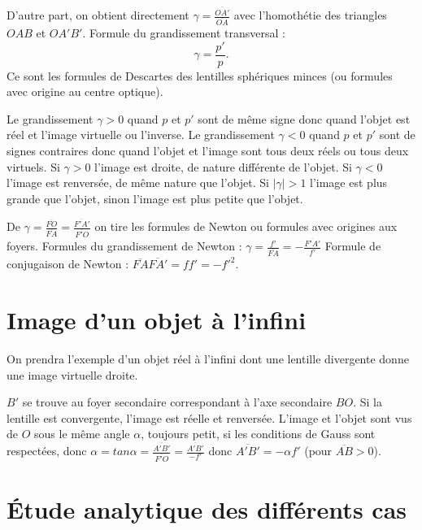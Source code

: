 D'autre	 part, on obtient directement \(\gamma = 
\frac{\overline{OA'}}{\overline{OA}}\) avec l'homothétie des triangles \(OAB\) 
et \(OA'B'\).
Formule du grandissement transversal :
\begin{equation}%
  \gamma = \frac{p'}{p}.
\end{equation}%
Ce sont les formules de Descartes des lentilles sphériques minces (ou formules 
avec origine au centre optique).

Le grandissement \(\gamma > 0\) quand \(p\) et \(p'\) sont de même signe donc 
quand l'objet est réel et l'image virtuelle ou l'inverse. Le grandissement 
\(\gamma < 0\) quand \(p\) et \(p'\) sont de signes contraires donc quand 
l'objet et l'image sont tous deux réels ou tous deux virtuels. Si \(\gamma > 
0\) l'image est droite, de nature différente de l'objet. Si \(\gamma < 0\) 
l'image est renversée, de même nature que l'objet. Si \(|\gamma| > 1\)  l'image 
est plus grande que l'objet, sinon l'image est plus petite que l'objet.

De \(\gamma = \frac{\overline{FO}}{\overline{FA}} = 
\frac{\overline{F'A'}}{\overline{F'O}}\) on tire les formules de Newton ou 
formules avec origines aux foyers.
Formules du grandissement de Newton : \(\gamma = 
\frac{f'}{\overline{FA}}=-\frac{\overline{F'A'}}{f'}\)
Formule de conjugaison de Newton : \(\overline{FA}\overline{FA'} = ff' = 
-f'^2\).

\section{Image d'un objet à l'infini}%
\label{chap8-sec:imagealinfini}%

On prendra l'exemple d'un objet réel à l'infini dont une lentille divergente 
donne une image virtuelle droite.
%

\(B'\) se trouve au foyer secondaire correspondant à l'axe secondaire \(BO\). 
Si la lentille est convergente, l'image est réelle et renversée. L'image et 
l'objet sont vus de \(O\) sous le même angle \(\alpha\), toujours petit, si les 
conditions de Gauss sont respectées, donc \(\alpha = tan \alpha = 
\frac{\overline{A'B'}}{\overline{F'O}} = \frac{\overline{A'B'}}{-f'}\) donc 
\(\overline{A'B'} = -\alpha f'\)  (pour \(\overline{AB}>0\)).

\section{Étude analytique des différents cas}%
\label{chap8-sec:etudeanalytique}%


